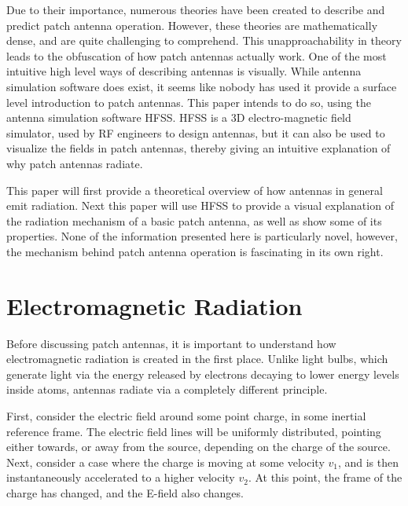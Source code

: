 \documentclass[12pt]{article}
\begin{document}
Due to their importance, numerous theories have been created to describe and predict patch antenna operation. However, these theories are mathematically dense, and are quite challenging to comprehend. This unapproachability in theory leads to the obfuscation of how patch antennas actually work. One of the most intuitive high level ways of describing antennas is visually. While antenna simulation software does exist, it seems like nobody has used it provide a surface level introduction to patch antennas. This paper intends to do so, using the antenna simulation software HFSS. HFSS is a 3D electro-magnetic field simulator, used by RF engineers to design antennas, but it can also be used to visualize the fields in patch antennas, thereby giving an intuitive explanation of why patch antennas radiate.

This paper will first provide a theoretical overview of how antennas in general emit radiation. Next this paper will use HFSS to provide a visual explanation of the radiation mechanism of a basic patch antenna, as well as show some of its properties. None of the information presented here is particularly novel, however, the mechanism behind patch antenna operation is fascinating in its own right. 
\section{Electromagnetic Radiation}  

Before discussing patch antennas, it is important to understand how electromagnetic radiation is created in the first place. Unlike light bulbs, which generate light via the energy released by electrons decaying to lower energy levels inside atoms, antennas radiate via a completely different principle.

First, consider the electric field around some point charge, in some inertial reference frame. The electric field lines will be uniformly distributed, pointing either towards, or away from the source, depending on the charge of the source\cite{schroeder}. Next, consider a case where the charge is moving at some velocity $v_1$, and is then instantaneously accelerated to a higher velocity $v_2$. At this point, the frame of the charge has changed, and the E-field also changes.   
\end{document}

